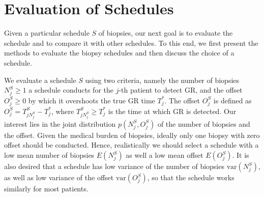
\section{Evaluation of Schedules}
\label{sec : choosing_schedule}
Given a particular schedule $S$ of biopsies, our next goal is to evaluate the schedule and to compare it with other schedules. To this end, we first present the methods to evaluate the biopsy schedules and then discuss the choice of a schedule.

We evaluate a schedule $S$ using two criteria, namely the number of biopsies $N^S_j \geq 1$ a schedule conducts for the $j$-th patient to detect GR, and the offset $O^S_j \geq 0$ by which it overshoots the true GR time $T^*_j$. The offset $O^S_j$ is defined as $O^S_j = T^S_{j{N^S_j}} - T^*_j$, where $T^S_{j{N^S_j}} \geq T^*_j$ is the time at which GR is detected. Our interest lies in the joint distribution $p(N^S_j, O^S_j)$ of the number of biopsies and the offset. Given the medical burden of biopsies, ideally only one biopsy with zero offset should be conducted. Hence, realistically we should select a schedule with a low mean number of biopsies $E(N^S_j)$ as well a low mean offset $E(O^S_j)$. It is also desired that a schedule has low variance of the number of biopsies $\mbox{var}(N^S_j)$, as well as low variance of the offset $\mbox{var}(O^S_j)$, so that the schedule works similarly for most patients. 

